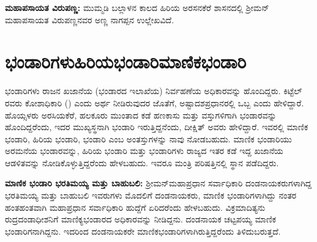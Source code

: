 \textbf{ಮಹಾಪಸಾಯತ ವಿರುಪಣ್ಣ:} ಮುಮ್ಮಡಿ ಬಲ್ಲಾಳನ ಕಾಲದ ಹಿರಿಯ ಅರಸನಕೆರೆ ಶಾಸನದಲ್ಲಿ ಶ‍್ರೀಮನ್​ ಮಹಾಪಸಾಯತ ವಿರುಪಣ್ಣನವರ ಅಣ್ಣ ನಾಗಪ್ಪನ ಉಲ್ಲೇಖವಿದೆ.


\section*{ಭಂಡಾರಿಗಳು\enginline{-}ಹಿರಿಯಭಂಡಾರಿ\enginline{-}ಮಾಣಿಕಭಂಡಾರಿ}

ಭಂಡಾರಿಗಳು ರಾಜನ ಖಜಾನೆಯ (ಭಂಡಾರದ ಇಲಾಖೆಯ) ನಿರ್ವಹಣೆಯ ಅಧಿಕಾರವನ್ನು ಹೊಂದಿದ್ದರು. ಕಿಟ್ಟೆಲ್​ರವರು ಕೋಶಾಧಿಕಾರಿ () ಎಂದು ಅರ್ಥ ನೀಡಿರುವುದರ ಜೊತೆಗೆ, ಅಷ್ಟಾದಶಪ್ರಧಾನರಲ್ಲಿ ಒಬ್ಬ ಎಂದು ಹೇಳಿದ್ದಾರೆ. ಹೊಯ್ಸಳರು ಅರಸಿಯಕೆರೆ, ಹಲಕೂರು ಮುಂತಾದ ಕಡೆ ಹಣಕಾಸು ಮತ್ತು ವಸ್ತುಗಳಿಗಾಗಿ ಭಂಡಾರವನ್ನು ಹೊಂದಿದ್ದರೆಂದು, ಇದರ ಮುಖ್ಯಸ್ಥನಾಗಿ ಭಂಡಾರಿ ಇರುತ್ತಿದ್ದನೆಂದು, ದೀಕ್ಷಿತ್​ ಅವರು ಹೇಳಿದ್ದಾರೆ. ಇವರಲ್ಲಿ ಮಾಣಿಕ ಭಂಡಾರಿ, ಹಿರಿಯ ಭಂಡಾರಿ, ಭಂಡಾರಿ ಎಂಬ ಅಂತಸ್ತುಗಳನ್ನು ನಾವು ನೋಡಬಹುದು. ಮಾಣಿಕ ಭಂಡಾರಿಯು ಅರಮನೆಯ ಭಂಡಾರವನ್ನು, ಹಿರಿಯ ಭಂಡಾರಿ ಮತ್ತು ಭಂಡಾರಿಗಳು ರಾಜ್ಯದ ಇತರ ಕಡೆ ಇದ್ದ ಖಜಾನೆಯ ಆಡಳಿತವನ್ನು ನೋಡಿಕೊಳ್ಳುತ್ತಿದ್ದರೆಂದು ಹೇಳಬಹುದು. ಇವರೂ ಮಂತ್ರಿ ಪರಿಷತ್ತಿನಲ್ಲಿ ಸ್ಥಾನ ಪಡೆದಿದ್ದರು.

\textbf{ಮಾಣಿಕ ಭಂಡಾರಿ ಭರತಿಮಯ್ಯ ಮತ್ತು ಬಾಹುಬಲಿ:} ಶ‍್ರೀಮನ್​ಮಹಾಪ್ರಧಾನ ಸರ್ವಾಧಿಕಾರಿ ದಂಡನಾಯಕರು\-ಗಳಾಗಿದ್ದ ಭರತಿಮಯ್ಯ ಮತ್ತು ಬಾಹುಬಲಿ ಇವರುಗಳು ಮೊದಲಿಗೆ ದಂಡನಾಯಕರು, ಮಾಣಿಕ ಭಂಡಾರಿಗಳಾಗಿದ್ದು ನಂತರ ಹಂತಹಂತವಾಗಿ ಮಹಾಪ್ರಧಾನ ಸರ್ವಾಧಿಕಾರಿ ಹುದ್ದೆಗೆ ಏರಿದರೆಂದು ಹೇಳಬಹುದು. ವಿಕ್ರಮಾದಿತ್ಯನು ರುದ್ರದಂಡಾಧೀಶ\-ನಿಗೆ ಮಾಣಿಕ್ಯಭಂಡಾರದ ಅಧಿಕಾರವನ್ನು ನೀಡಿದ್ದನು. ದಂಡನಾಯಕ ಚಟ್ಟಪಯ್ಯ ಮಾಣಿಕ ಭಂಡಾರಿಗನಾಗಿದ್ದನು. ಇದರಿಂದ ದಂಡನಾಯಕರೇ ಮಾಣಿಕಭಂಡಾರಿಗಳಾಗಿರುತ್ತಿದ್ದರೆಂದು ತಿಳಿದುಬರುತ್ತದೆ.

